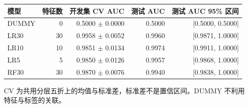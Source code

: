 \begin{center}
\small
\setlength{\tabcolsep}{5pt}
\renewcommand{\arraystretch}{1.25}
\begin{tabular}{lrrrr}
\toprule
模型 & 特征数 & 开发集 CV AUC & 测试 AUC & 测试 AUC 95\% 区间 \tabularnewline
\midrule
DUMMY & 0 & 0.5000 $\pm$ 0.0000 & 0.5000 & [0.5000, 0.5000] \tabularnewline
LR30 & 30 & 0.9958 $\pm$ 0.0052 & 0.9960 & [0.9871, 1.0000] \tabularnewline
LR10 & 10 & 0.9851 $\pm$ 0.0134 & 0.9974 & [0.9911, 1.0000] \tabularnewline
LR5 & 5 & 0.9850 $\pm$ 0.0126 & 0.9957 & [0.9868, 1.0000] \tabularnewline
RF30 & 30 & 0.9870 $\pm$ 0.0076 & 0.9940 & [0.9838, 1.0000] \tabularnewline
\bottomrule
\end{tabular}
\end{center}
{\footnotesize CV 为共用分层五折上的均值与标准差，标准差不是置信区间。DUMMY 不利用特征与标签的关联。}
